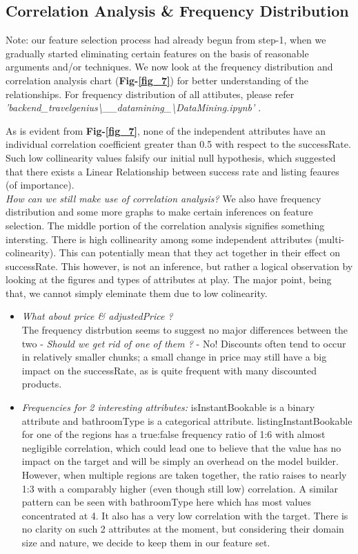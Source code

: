 \documentclass[conference]{IEEEtran}
\begin{document}
{	
     \subsection{\textbf{Correlation Analysis \& Frequency Distribution}}
	Note: our feature selection process had already begun from step-1, when we gradually started eliminating certain features on the basis of reasonable arguments and/or techniques.
	We now look at the frequency distribution and correlation analysis chart (\textbf{Fig-\ref{fig_7}}) for better understanding of the relationships. For frequency distribution of all attibutes, please refer \textit{'backend\_travelgenius{\textbackslash}\_\_datamining\_{\textbackslash}DataMining.ipynb' \cite{4_Backend}}.
	
	As is evident from \textbf{Fig-\ref{fig_7}}, none of the independent attributes have an individual correlation coefficient greater than 0.5 with respect to the successRate. Such low collinearity values falsify our initial null hypothesis, which suggested that there exists a Linear Relationship between success rate and listing feaures (of importance).\\
	\textit{How can we still make use of correlation analysis?}  We also have frequency distribution and some more graphs to make certain inferences on feature selection. The middle portion of the correlation analysis signifies something intersting. There is high collinearity among some independent attributes (multi-colinearity). This can potentially mean that they act together in their effect on successRate. This however, is not an inference, but rather a logical observation by looking at the figures and types of attributes at play. The major point, being that, we cannot simply eleminate them due to low colinearity.

	

	\begin{itemize}
		\item \textit{What about price \& adjustedPrice ?}\\
The frequency distrbution seems to suggest no major differences between the two - \textit{Should we get rid of one of them ?} - No! Discounts often tend to occur in relatively smaller chunks; a small change in price may still have a big impact on the successRate, as is quite frequent with many discounted products.

		\item \textit{Frequencies for 2 interesting attributes:} isInstantBookable is a binary attribute and bathroomType is a categorical attribute. listingInstantBookable for one of the regions has a true:false frequency ratio of 1:6 with almost negligible correlation, which could lead one to believe that the value has no impact on the target and will be simply an overhead on the model builder. However, when multiple regions are taken together, the ratio raises to nearly 1:3 with a comparably higher (even though still low) correlation. A similar pattern can be seen with bathroomType here which has most values concentrated at 4. It also has a very low correlation with the target. There is no clarity on such 2 attributes at the moment, but considering their domain size and nature, we decide to keep them in our feature set.
	\end{itemize}

}
\end{document}
